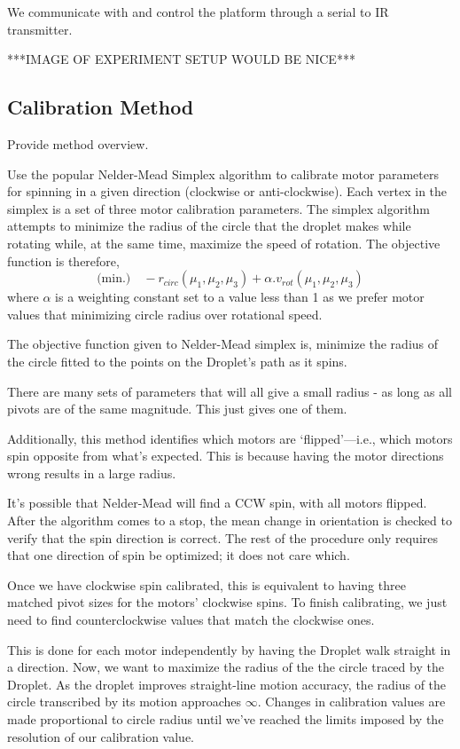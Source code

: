 \documentclass[letterpaper, 10pt, conference]{ieeeconf}
\begin{document}
We communicate with and control the platform through a serial to IR transmitter. 

***IMAGE OF EXPERIMENT SETUP WOULD BE NICE***


\subsection{Calibration Method}
Provide method overview.

Use the popular Nelder-Mead Simplex algorithm \cite{NelderMead} to calibrate motor parameters for spinning in a given direction (clockwise or anti-clockwise). Each vertex in the simplex is a set of three motor calibration parameters. The simplex algorithm attempts to minimize the radius of the circle that the droplet makes while rotating while, at the same time, maximize the speed of rotation. The objective function is therefore,
\begin{equation}
\text{(min.)} \quad -r_{circ}(\mu_1, \mu_2, \mu_3) + \alpha.v_{rot}(\mu_1, \mu_2, \mu_3)
\end{equation}
where $\alpha$ is a weighting constant set to a value less than 1 as we prefer motor values that minimizing circle radius over rotational speed.

The objective function given to Nelder-Mead simplex is, minimize the radius of the circle fitted to the points on the Droplet's path as it spins.

There are many sets of parameters that will all give a small radius - as long as all pivots are of the same magnitude. This just gives one of them.

Additionally, this method identifies which motors are `flipped'---i.e., which motors spin opposite from what's expected. This is because having the motor directions wrong results in a large radius.

It's possible that Nelder-Mead will find a CCW spin, with all motors flipped. After the algorithm comes to a stop, the mean change in orientation is checked to verify that the spin direction is correct. The rest of the procedure only requires that one direction of spin be optimized; it does not care which.

Once we have clockwise spin calibrated, this is equivalent to having three matched pivot sizes for the motors' clockwise spins. To finish calibrating, we just need to find counterclockwise values that match the clockwise ones.

This is done for each motor independently by having the Droplet walk straight in a direction. Now, we want to maximize the radius of the the circle traced by the Droplet. As the droplet improves straight-line motion accuracy, the radius of the circle transcribed by its motion approaches $\infty$. Changes in calibration values are made proportional to circle radius until we've reached the limits imposed by the resolution of our calibration value.
\end{document}
